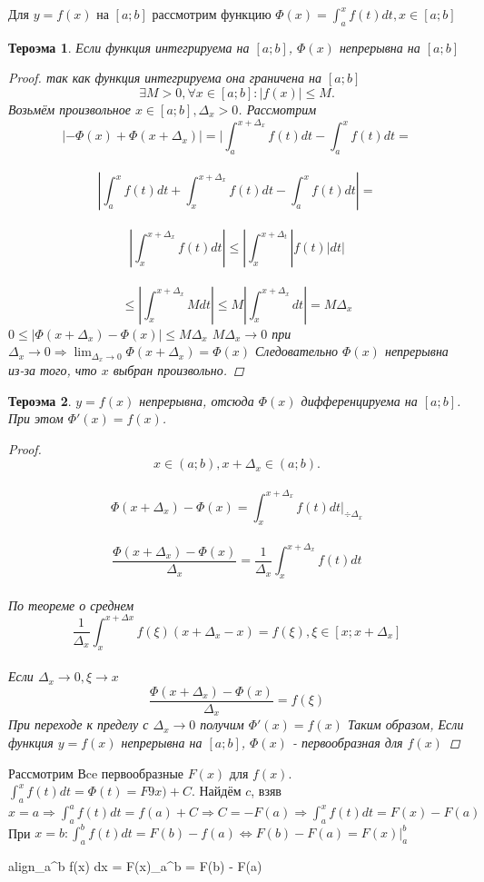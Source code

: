 \documentclass[oneside]{book}
\newcommand{\boxedeq}[2]{\begin{empheq}[box={\fboxsep=6pt\fbox}]{align}\label{#1}#2\end{empheq}}
\newtheorem{thm}{Тероэма}[chapter] %
\begin{document}
\begin{itemize}
\begin{enumerate}
Для $y = f(x)$ на $[a;b]$ рассмотрим функцию $\Phi(x) = \int_{a}^x f(t) dt, x \in [a;b]$
\begin{thm}
  Если функция интегрируема на $[a;b]$, $\Phi(x)$ непрерывна на $[a;b]$
  \begin{proof}
    так как функция интегрируема она граничена на $[a;b]$ $$
      \exists M > 0, \forall x \in [a;b]: |f(x)| \leq M.
    $$
    Возьмём произвольное $x \in [a;b], \Delta_x > 0$.
    Рассмотрим $$
      |-\Phi(x) + \Phi(x+\Delta_x)| = |\int_{a}^{x+\Delta_x} f(t) dt - \int_{a}^x f(t) dt = $$\\$$
      |\int_{a}^x f(t) dt + \int_{x}^{x+\Delta_x} f(t) dt - \int_{a}^x f(t) dt| = $$\\$$
      |\int_{x}^{x+\Delta_x} f(t) dt| \leq |\int_{x}^{x+\Delta_t} |f(t)| dt| $$\\$$
      \leq |\int_{x}^{x+\Delta_x} M dt| \leq M|\int_{x}^{x+\Delta_x} dt| = M\Delta_x
      $$ $ 0 \leq |\Phi(x+\Delta_x) - \Phi(x)| \leq M\Delta_x $
      $M\Delta_x \rightarrow 0 $ при $ \Delta_x \rightarrow 0 \Rightarrow \lim_{\Delta_x \rightarrow 0}{\Phi(x+\Delta_x)} = \Phi(x)$
      Следовательно $\Phi(x)$ непрерывна из-за того, что $x$ выбран произвольно.
  \end{proof}
\end{thm}
\begin{thm}
  $y = f(x)$ непрерывна, отсюда $\Phi(x)$ дифференцируема на $[a;b]$. При этом $\Phi'(x) = f(x)$.
  \begin{proof}
    $$
      x \in (a;b), x + \Delta_x \in (a;b). $$\\$$
      \Phi (x+\Delta_x) - \Phi(x) = \int_{x}^{x+\Delta_x} f(t) dt \vert_{\div \Delta_x}$$\\$$
      \frac{\Phi(x+\Delta_x) - \Phi(x)}{\Delta_x} = \frac{1}{\Delta_x}\int_{x}^{x+\Delta_x} f(t) dt$$\\
    По теореме о среднем $$
      \frac{1}{\Delta_x} \int_{x}^{x+\Delta x} f(\xi)(x+\Delta_x - x) = f(\xi), \xi \in [x; x+\Delta_x]$$\\
      Если $\Delta_x \rightarrow 0, \xi \rightarrow x$ $$
        \frac{\Phi(x+\Delta_x) - \Phi(x)}{\Delta_x} = f(\xi)
      $$ При переходе к пределу с $\Delta_x \rightarrow 0$ получим $\Phi'(x) = f(x)$
      Таким образом, Если функция $y = f(x)$ непрерывна на $[a;b]$, $\Phi(x)$ - первообразная для $f(x)$
  \end{proof}
\end{thm}
Рассмотрим Вce первообразные $F(x)$ для $f(x)$. $\int_{a}^x f(t) dt = \Phi(t) = F9x)+C$.
Найдём $c$, взяв $x = a \Rightarrow \int_{a}^a f(t) dt = f(a)+C \Rightarrow C = -F(a) \Rightarrow \int_{a}^x f(t) dt = F(x) - F(a)$ \\
При $x = b: \int_{a}^b f(t) dt = F(b) - f(a) \Leftrightarrow F(b) - F(a) = F(x)\vert_{a}^{b}$
\boxedeq{eq:*}{\int_{a}^b f(x) dx = F(x)\vert_{a}^{b} = F(b) - F(a)}



\end{enumerate}
\end{itemize}
\end{document}
